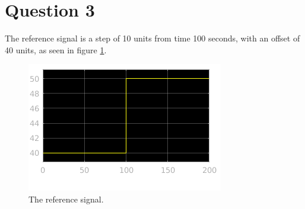 \section{Question 3}

The reference signal is a step of 10 units from time 100 seconds, with an offset
of 40 units, as seen in figure \ref{fig:Q3}.

\begin{figure}[H]\centering
  \includegraphics[scale=1]{./images/3/3.png}
  \caption{The reference signal.}
  \label{fig:Q3}
\end{figure}
